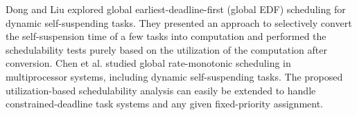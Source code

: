 Dong and Liu \cite{dong-liu-RTSS2016} explored global earliest-deadline-first (global EDF) scheduling for dynamic self-suspending tasks. They presented an approach to selectively convert the self-suspension time of a few tasks into computation and performed the schedulability tests purely based on the utilization of the computation after conversion.
Chen et al. \cite{ChenHLRTSS2015} studied global rate-monotonic scheduling in multiprocessor systems, including dynamic self-suspending tasks. The proposed utilization-based schedulability analysis  can easily be extended to handle constrained-deadline task systems and any given fixed-priority assignment.
  
  




  
